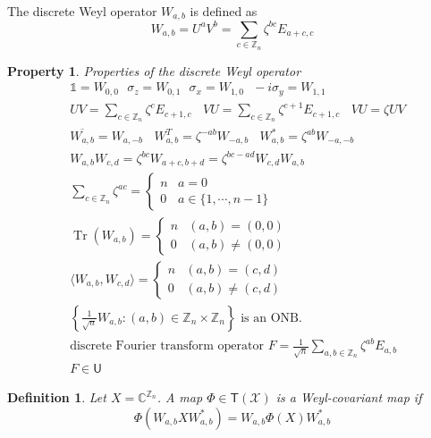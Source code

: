 \documentclass[aps,pra,onecolumn,notitlepage,superscriptaddress]{revtex4-1}
\newcommand{\Z}{\mathbb{Z}}
\newcommand{\C}{\mathbb{C}}
\newcommand{\spc}[1]{\mathcal{#1}}
\newcommand{\U}{\mathsf{U}}
\newcommand{\T}{\mathsf{T}}
\def\>{\rangle}
\def\<{\langle}
\newcommand{\Tr}{\operatorname{Tr}}
\newcommand\I{\mathds{1}}
\newtheorem{defi}{Definition}
\newtheorem{proper}{Property}
\begin{document}
    The discrete Weyl operator $W_{a,b}$ is defined as
    \begin{equation}
        W_{a,b} = U^aV^b = \sum_{c \in \Z_n} \zeta^{bc}E_{a+c,c}
    \end{equation}

    \begin{proper}
        Properties of the discrete Weyl operator
        \begin{align}
            &\I = W_{0,0} \ \ \ \sigma_z = W_{0,1} \ \ \ \sigma_x = W_{1,0} \ \ \ -i\sigma_y = W_{1,1} \\
            &UV = \sum_{c \in \Z_n}\zeta^c E_{c+1,c} \ \ \ \  
                VU = \sum_{c \in \Z_n}\zeta^{c+1} E_{c+1,c} \ \ \ \
                VU = \zeta UV \\
            &\overline{W_{a,b}} = W_{a,-b} \ \ \ \
            W^T_{a,b} = \zeta^{-ab}W_{-a,b} \ \ \ \
            W^*_{a,b} = \zeta^{ab}W_{-a,-b} \\
            &W_{a,b}W_{c,d} = \zeta^{bc} W_{a+c,b+d} = \zeta^{bc-ad} W_{c,d}W_{a,b} \\
            & \sum_{c \in \Z_n} \zeta^{ac} = \begin{cases}
                n & a = 0 \\
                0 & a \in \{ 1, \cdots, n-1 \}
            \end{cases} \\
            &\Tr(W_{a,b}) = \begin{cases}
                n & (a,b) = (0,0) \\
                0 & (a,b) \neq (0,0)
            \end{cases} \\
            &\< W_{a,b}, W_{c,d} \> = \begin{cases}
                n & (a,b) = (c,d) \\
                0 & (a,b) \neq (c,d)
            \end{cases} \\
            & \left\{ \frac{1}{\sqrt{n}} W_{a,b} : (a,b) \in \Z_n \times \Z_n \right\} \text{ is an ONB.} \\
            & \text{discrete Fourier transform operator } F = \frac{1}{\sqrt{n}} \sum_{a,b \in \Z_n} \zeta^{ab} E_{a,b} \\
            & F \in \U
        \end{align}
    \end{proper}

    \begin{defi}
        Let $X = \C^{\Z_n}$. A map $\Phi \in \T(\spc X)$ is a Weyl-covariant map if
        \begin{equation}
            \Phi(W_{a,b} X W_{a,b}^*) = W_{a,b} \Phi(X) W_{a,b}^*
        \end{equation}
    \end{defi}
\end{document}
